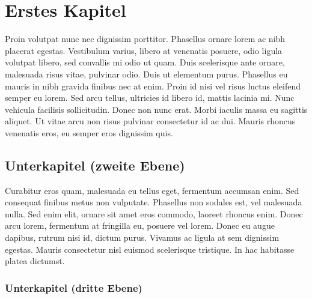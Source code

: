 \documentclass[12pt,a4paper,parskip=half]{scrartcl}
\begin{document}


\section{Erstes Kapitel}


Proin volutpat nunc nec dignissim porttitor. Phasellus ornare lorem ac nibh placerat egestas. Vestibulum varius, libero at venenatis posuere, odio ligula volutpat libero, sed convallis mi odio ut quam. Duis scelerisque ante ornare, malesuada risus vitae, pulvinar odio. Duis ut elementum purus. Phasellus eu mauris in nibh gravida finibus nec at enim. Proin id nisi vel risus luctus eleifend semper eu lorem. Sed arcu tellus, ultricies id libero id, mattis lacinia mi. Nunc vehicula facilisis sollicitudin. Donec non nunc erat. Morbi iaculis massa eu sagittis aliquet. Ut vitae arcu non risus pulvinar consectetur id ac dui. Mauris rhoncus venenatis eros, eu semper eros dignissim quis.

\subsection{Unterkapitel (zweite Ebene)}

Curabitur eros quam, malesuada eu tellus eget, fermentum accumsan enim. Sed consequat finibus metus non vulputate. Phasellus non sodales est, vel malesuada nulla. Sed enim elit, ornare sit amet eros commodo, laoreet rhoncus enim. Donec arcu lorem, fermentum at fringilla eu, posuere vel lorem. Donec eu augue dapibus, rutrum nisi id, dictum purus. Vivamus ac ligula at sem dignissim egestas. Mauris consectetur nisl euismod scelerisque tristique. In hac habitasse platea dictumst.

\subsubsection{Unterkapitel (dritte Ebene)}
\end{document}
